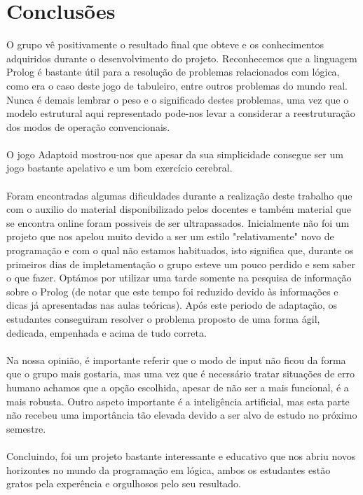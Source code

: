\documentclass[a4paper]{article}
\begin{document}
\section{Conclusões}
O grupo vê positivamente o resultado final que obteve e os conhecimentos adquiridos durante o desenvolvimento do projeto. Reconhecemos que a linguagem Prolog é bastante útil para a resolução de problemas relacionados com lógica, como era o caso deste jogo de tabuleiro, entre outros problemas do mundo real. Nunca é demais lembrar o peso e o significado destes problemas, uma vez que o modelo estrutural aqui representado pode-nos levar a considerar a reestruturação dos modos de operação convencionais.
\\
\\
O jogo Adaptoid mostrou-nos que apesar da sua simplicidade consegue ser um jogo bastante apelativo e um bom exercício cerebral.
\\
\\
Foram encontradas algumas dificuldades durante a realização deste trabalho que com o auxilio do material disponibilizado pelos docentes e também material que se encontra online foram possiveis de ser ultrapassados. Inicialmente não foi um projeto que nos apelou muito devido a ser um estilo "relativamente" novo de programação e com o qual não estamos habituados, isto significa que, durante os primeiros dias de impletamentação o grupo esteve um pouco perdido e sem saber o que fazer. Optámos por utilizar uma tarde somente na pesquisa de informação sobre o Prolog (de notar que este tempo foi reduzido devido às informações e dicas já apresentadas nas aulas teóricas). Após este periodo de adaptação, os estudantes conseguiram resolver o problema proposto de uma forma ágil, dedicada, empenhada e acima de tudo correta.
\\
\\
Na nossa opinião, é importante referir que o modo de input não ficou da forma que o grupo mais gostaria, mas uma vez que é necessário tratar situações de erro humano achamos que a opção escolhida, apesar de não ser a mais funcional, é a mais robusta. Outro aspeto importante é a inteligência artificial, mas esta parte não recebeu uma importância tão elevada devido a ser alvo de estudo no próximo semestre.
\\
\\
Concluindo, foi um projeto bastante interessante e educativo que nos abriu novos horizontes no mundo da programação em lógica, ambos os estudantes estão gratos pela experência e orgulhosos pelo seu resultado.
\end{document}
